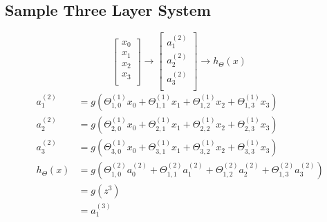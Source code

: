 \documentclass[11pt, oneside]{article}
\begin{document}
\subsection{Sample Three Layer System}
	\begin{figure}[!h]
	    \centering
	    \begin{minipage}{.5\textwidth}
	    	\centering
	        \begin{equation*}
				\begin{bmatrix} 
					x_0 \\
					x_1 \\
					x_2 \\
					x_3 \\
				\end{bmatrix}
				\rightarrow
				\begin{bmatrix} 
					a_1^{(2)} \\
					a_2^{(2)} \\
					a_3^{(2)} \\
				\end{bmatrix}
				\rightarrow
				h_\Theta(x)
			\end{equation*}
			\begin{align*}
				a_1^{(2)} &= g(\Theta_{1,0}^{(1)} x_0 + \Theta_{1,1}^{(1)} x_1 + \Theta_{1,2}^{(1)} x_2 + \Theta_{1,3}^{(1)} x_3) \\
				a_2^{(2)} &= g(\Theta_{2,0}^{(1)} x_0 + \Theta_{2,1}^{(1)} x_1 + \Theta_{2,2}^{(1)} x_2 + \Theta_{2,3}^{(1)} x_3) \\
				a_3^{(2)} &= g(\Theta_{3,0}^{(1)} x_0 + \Theta_{3,1}^{(1)} x_1 + \Theta_{3,2}^{(1)} x_2 + \Theta_{3,3}^{(1)} x_3) \\
				h_\Theta(x) &= g(\Theta_{1,0}^{(2)} a_0^{(2)} + \Theta_{1,1}^{(2)} a_1^{(2)} + \Theta_{1,2}^{(2)} a_2^{(2)} + \Theta_{1,3}^{(2)} a_3^{(2)})\\
				&= g(z^3)\\
				&= a_1^{(3)}
			\end{align*}
	    \end{minipage}%
	    \begin{minipage}{0.5\textwidth}
	    	\centering
\end{minipage}
\end{figure}
\end{document}
